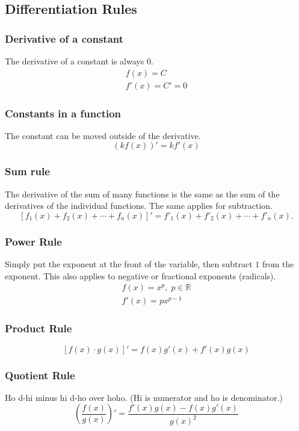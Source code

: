 \documentclass[12pt]{article}
\begin{document}
\subsection{Differentiation Rules}
\subsubsection{Derivative of a constant}
\noindent The derivative of a constant is always $0$.
\begin{gather*}
	f(x) = C \\
	f'(x) = C' = 0
\end{gather*}

\subsubsection{Constants in a function}
\noindent The constant can be moved outside of the derivative.
\[ \left( k f(x) \right)' = k f'(x) \]

\subsubsection{Sum rule}
The derivative of the sum of many functions is the same as the sum of the derivatives of the individual functions. The same applies for subtraction.
\[ \left[ f_1(x) + f_2(x) + \cdots + f_n(x) \right]' = f'_1(x) + f'_2(x) + \cdots + f'_n(x). \]

\subsubsection{Power Rule}
Simply put the exponent at the front of the variable, then subtract $1$ from the exponent. This also applies to negative or fractional exponents (radicals).
\begin{gather*}
	f(x) = x^p, \; p \in \mathbb{R} \\
	f'(x) = px^{p-1}
\end{gather*}

\subsubsection{Product Rule}
\[ \left[ f(x) \cdot g(x) \right]' = f(x)g'(x) + f'(x)g(x) \]

\subsubsection{Quotient Rule}
\noindent Ho d-hi minus hi d-ho over hoho. (Hi is numerator and ho is denominator.)
\[ \left( \frac{f(x)}{g(x)} \right)' = \frac{f'(x)g(x) - f(x)g'(x)}{g(x)^2} \]
\end{document}
